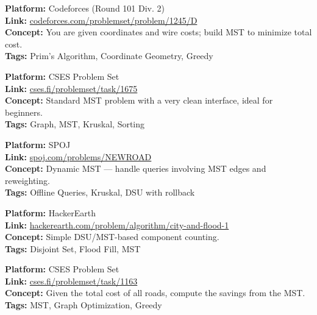 \documentclass[14pt,a4paper]{extarticle}
\begin{document}
\begin{tcolorbox}[title=2. \textbf{Planet Connections}]
\textbf{Platform:} Codeforces (Round 101 Div. 2) \\
\textbf{Link:} \href{https://codeforces.com/problemset/problem/1245/D}{codeforces.com/problemset/problem/1245/D} \\
\textbf{Concept:} You are given coordinates and wire costs; build MST to minimize total cost. \\
\textbf{Tags:} Prim’s Algorithm, Coordinate Geometry, Greedy
\end{tcolorbox}

\begin{tcolorbox}[title=3. \textbf{Fiber Network}]
\textbf{Platform:} CSES Problem Set \\
\textbf{Link:} \href{https://cses.fi/problemset/task/1675}{cses.fi/problemset/task/1675} \\
\textbf{Concept:} Standard MST problem with a very clean interface, ideal for beginners. \\
\textbf{Tags:} Graph, MST, Kruskal, Sorting
\end{tcolorbox}

\begin{tcolorbox}[title=4. \textbf{New Roads Queries}]
\textbf{Platform:} SPOJ \\
\textbf{Link:} \href{https://www.spoj.com/problems/NEWROAD/}{spoj.com/problems/NEWROAD} \\
\textbf{Concept:} Dynamic MST — handle queries involving MST edges and reweighting. \\
\textbf{Tags:} Offline Queries, Kruskal, DSU with rollback
\end{tcolorbox}

\begin{tcolorbox}[title=5. \textbf{City and Flood}]
\textbf{Platform:} HackerEarth \\
\textbf{Link:} \href{https://www.hackerearth.com/problem/algorithm/city-and-flood-1/}{hackerearth.com/problem/algorithm/city-and-flood-1} \\
\textbf{Concept:} Simple DSU/MST-based component counting. \\
\textbf{Tags:} Disjoint Set, Flood Fill, MST
\end{tcolorbox}

\begin{tcolorbox}[title=6. \textbf{Dark Roads}]
\textbf{Platform:} CSES Problem Set \\
\textbf{Link:} \href{https://cses.fi/problemset/task/1163}{cses.fi/problemset/task/1163} \\
\textbf{Concept:} Given the total cost of all roads, compute the savings from the MST. \\
\textbf{Tags:} MST, Graph Optimization, Greedy
\end{tcolorbox}
\end{document}
